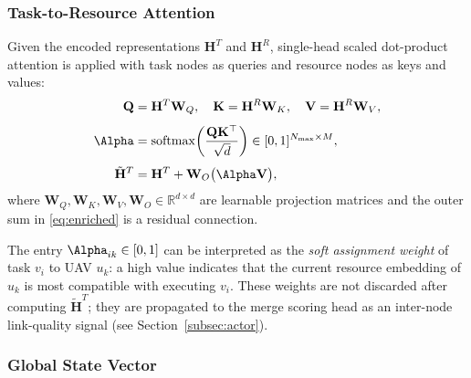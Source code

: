 \subsubsection*{Task-to-Resource Attention}

Given the encoded representations $\mathbf{H}^T$ and $\mathbf{H}^R$,
single-head scaled dot-product attention is applied with task nodes
as queries and resource nodes as keys and values:
\begin{align}
  \mathbf{Q} &= \mathbf{H}^T \mathbf{W}_Q,\quad
  \mathbf{K}  = \mathbf{H}^R \mathbf{W}_K,\quad
  \mathbf{V}  = \mathbf{H}^R \mathbf{W}_V,
  \label{eq:qkv}\\[4pt]
  \boldsymbol{\Alpha} &=
    \mathrm{softmax}\!\left(
      \frac{\mathbf{Q}\mathbf{K}^\top}{\sqrt{d}}
    \right) \in [0,1]^{N_{\max} \times M},
  \label{eq:attn}\\[4pt]
  \tilde{\mathbf{H}}^T &=
    \mathbf{H}^T + \mathbf{W}_O \bigl(\boldsymbol{\Alpha}\mathbf{V}\bigr),
  \label{eq:enriched}
\end{align}
where $\mathbf{W}_Q, \mathbf{W}_K, \mathbf{W}_V, \mathbf{W}_O
\in \mathbb{R}^{d \times d}$ are learnable projection matrices
and the outer sum in \eqref{eq:enriched} is a residual connection.

The entry $\Alpha_{ik} \in [0,1]$ can be interpreted as the
\emph{soft assignment weight} of task $v_i$ to UAV $u_k$:
a high value indicates that the current resource embedding of $u_k$
is most compatible with executing $v_i$.
These weights are not discarded after computing $\tilde{\mathbf{H}}^T$;
they are propagated to the merge scoring head as an inter-node
link-quality signal (see Section~\ref{subsec:actor}).

\subsubsection*{Global State Vector}

